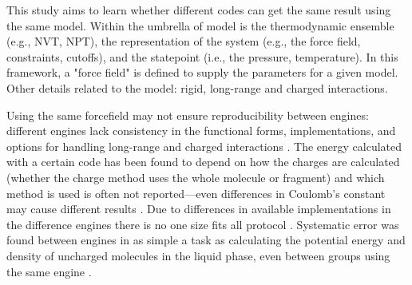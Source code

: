 This study aims to learn whether different codes can get the same result using the same model.
Within the umbrella of model is the thermodynamic ensemble (e.g., NVT, NPT), the representation of the system (e.g., the force field, constraints, cutoffs), and the statepoint (i.e., the pressure, temperature).
In this framework, a "force field" is defined to supply the parameters for a given model.
Other details related to the model: rigid, long-range and charged interactions.

Using the same forcefield may not ensure reproducibility between engines: different engines lack consistency in the functional forms, implementations, and options for handling long-range and charged interactions \citep{Rizzi2020}. 
The energy calculated with a certain code has been found to depend on how the charges are calculated (whether the charge method uses the whole molecule or fragment) and which method is used is often not reported---even differences in Coulomb's constant may cause different results \citep{Shirts2017}.
Due to differences in available implementations in the difference engines there is no one size fits all protocol \citep{Loeffler2018}.
Systematic error was found between engines in as simple a task as calculating the potential energy and density of uncharged molecules in the liquid phase, even between groups using the same engine \citep{Schappals2017}.

